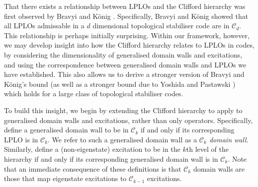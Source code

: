 \documentclass[pra,twocolumn,a4paper,nofootinbib]{revtex4-1}
\begin{document}
That there exists a relationship between LPLOs and the Clifford hierarchy was first observed by Bravyi and K{\"o}nig \cite{BK}. Specifically, Bravyi and K{\"o}nig showed that all LPLOs admissable in a $d$ dimensional topological stabiliser code are in $\mathcal{C}_d$. This relationship is perhaps initially surprising. Within our framework, however, we may develop insight into how the Clifford hierarchy relates to LPLOs in codes, by considering the dimensionality of generalised domain walls and excitations, and using the correspondence between generalised domain walls and LPLOs we have established. This also allows us to derive a stronger version of Bravyi and K{\"o}nig's bound (as well as a stronger bound due to Yoshida and Pastawski \cite{PY}) which holds for a large class of topological stabiliser codes.

To build this insight, we begin by extending the Clifford hierarchy to apply to generalised domain walls and excitations, rather than only operators. Specifically, define a generalised domain wall to be in $\mathcal{C}_k$ if and only if its corresponding LPLO is in $\mathcal{C}_k$. We refer to such a generalised domain wall as a \textit{$\mathcal{C}_k$ domain wall}. Similarly, define a (non-eigenstate) excitation to be in the $k$th level of the hierarchy if and only if its corresponding generalised domain wall is in $\mathcal{C}_k$. Note that an immediate consequence of these definitions is that $\mathcal{C}_k$ domain walls are those that map eigenstate excitations to $\mathcal{C}_{k-1}$ excitations.
\end{document}
